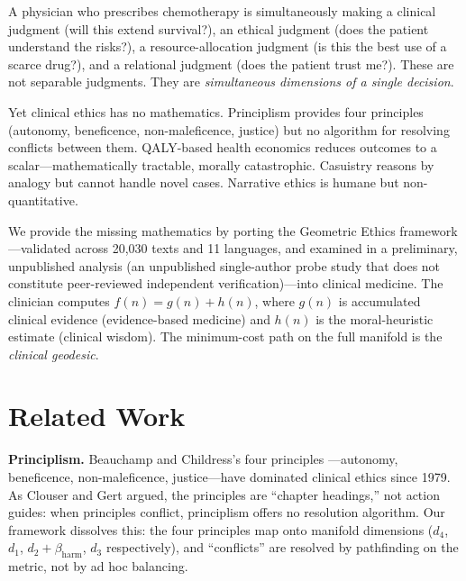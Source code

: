 \documentclass[12pt]{article}
\theoremstyle{definition}
\theoremstyle{remark}
\begin{document}
A physician who prescribes chemotherapy is simultaneously making a clinical judgment (will this extend survival?), an ethical judgment (does the patient understand the risks?), a resource-allocation judgment (is this the best use of a scarce drug?), and a relational judgment (does the patient trust me?).  These are not separable judgments.  They are \emph{simultaneous dimensions of a single decision}.

Yet clinical ethics has no mathematics.  Principlism \cite{beauchamp2019} provides four principles (autonomy, beneficence, non-maleficence, justice) but no algorithm for resolving conflicts between them.  QALY-based health economics \cite{weinstein1977,drummond2015} reduces outcomes to a scalar---mathematically tractable, morally catastrophic.  Casuistry \cite{jonsen1988} reasons by analogy but cannot handle novel cases.  Narrative ethics \cite{charon2006} is humane but non-quantitative.

We provide the missing mathematics by porting the Geometric Ethics framework \cite{bond2026geometric}---validated across 20,030 texts and 11 languages, and examined in a preliminary, unpublished analysis \cite{thiele2026} (an unpublished single-author probe study that does not constitute peer-reviewed independent verification)---into clinical medicine.  The clinician computes $f(n) = g(n) + h(n)$, where $g(n)$ is accumulated clinical evidence (evidence-based medicine) and $h(n)$ is the moral-heuristic estimate (clinical wisdom).  The minimum-cost path on the full manifold is the \emph{clinical geodesic}.


\section{Related Work}
\label{sec:related}

\textbf{Principlism.}  Beauchamp and Childress's four principles \cite{beauchamp2019}---autonomy, beneficence, non-maleficence, justice---have dominated clinical ethics since 1979.  As Clouser and Gert \cite{clouser1990} argued, the principles are ``chapter headings,'' not action guides: when principles conflict, principlism offers no resolution algorithm.  Our framework dissolves this: the four principles map onto manifold dimensions ($d_4$, $d_1$, $d_2 + \beta_{\text{harm}}$, $d_3$ respectively), and ``conflicts'' are resolved by pathfinding on the metric, not by ad hoc balancing.
\end{document}
